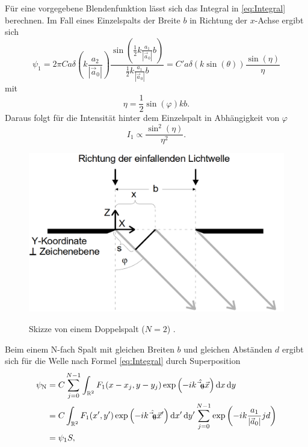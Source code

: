 Für eine vorgegebene Blendenfunktion lässt sich das Integral in \eqref{eq:Integral} berechnen. Im Fall eines Einzelspalts der Breite $b$ in Richtung der $x$-Achse ergibt sich
\begin{equation}
	\psi_1 = 2 \pi C a \delta\left(k \frac{a_2}{|\vec{a}_0|}\right) \frac{\sin\left(\frac{1}{2} k \frac{a_1}{|\vec{a}_0|} b\right)}{\frac{1}{2} k \frac{a_1}{|\vec{a}_0|} b} = C' a \delta(k \sin(\theta)) \frac{\sin(\eta)}{\eta}
\end{equation} 
mit 
\begin{equation}
	\eta = \frac{1}{2} \sin(\varphi) k b .
\end{equation}
Daraus folgt für die Intensität hinter dem Einzelspalt in Abhängigkeit von $\varphi$
\begin{equation}
	I_1 \propto \frac{\sin^2(\eta)}{\eta^2}\text{.}
\end{equation}
\begin{figure}
	\centering
	\caption{Skizze von einem Doppelspalt ($N=2$) \cite{V406}.}
	\includegraphics[width=\linewidth-150pt,height=\textheight-150pt,keepaspectratio]{content/images/Einzelspalt.png}
	\label{fig:Doppel}
\end{figure}
Beim einem N-fach Spalt mit gleichen Breiten $b$ und gleichen Abständen $d$ ergibt sich für die Welle nach Formel \eqref{eq:Integral} durch Superposition
\begin{equation}
\begin{split}
	\psi_\text{N} &=  C \sum\limits_{j=0}^{N-1} \int_{\mathbb{R}^2} F_1(x-x_j,y-y_j) \exp\left(-i k \hat{\vec{a}_0} \vec{x}\right) \mathop{}\!\mathrm{d} x \mathop{}\!\mathrm{d} y \\
	&= C \int_{\mathbb{R}^2} F_1(x',y') \exp\left(-i k \hat{\vec{a}_0} \vec{x}'\right) \mathop{}\!\mathrm{d} x' \mathop{}\!\mathrm{d} y'  \sum\limits_{j=0}^{N-1} \exp\left(-i k \frac{a_1}{|\vec{a}_0|} j d \right) \\
	&= \psi_1 S,
\end{split}
\end{equation}
